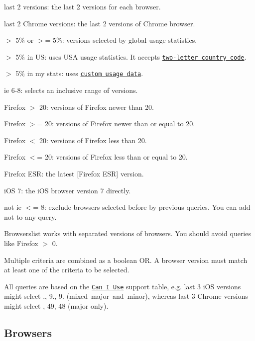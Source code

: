 \begin{DoxyItemize}
\item {\ttfamily last 2 versions}\+: the last 2 versions for each browser.
\item {\ttfamily last 2 Chrome versions}\+: the last 2 versions of Chrome browser.
\item {\ttfamily $>$ 5\%} or {\ttfamily $>$= 5\%}\+: versions selected by global usage statistics.
\item {\ttfamily $>$ 5\% in US}\+: uses U\+SA usage statistics. It accepts \href{http://en.wikipedia.org/wiki/ISO_3166-1_alpha-2#Officially_assigned_code_elements}{\tt two-\/letter country code}.
\item {\ttfamily $>$ 5\% in my stats}\+: uses \href{#custom-usage-data}{\tt custom usage data}.
\item {\ttfamily ie 6-\/8}\+: selects an inclusive range of versions.
\item {\ttfamily Firefox $>$ 20}\+: versions of Firefox newer than 20.
\item {\ttfamily Firefox $>$= 20}\+: versions of Firefox newer than or equal to 20.
\item {\ttfamily Firefox $<$ 20}\+: versions of Firefox less than 20.
\item {\ttfamily Firefox $<$= 20}\+: versions of Firefox less than or equal to 20.
\item {\ttfamily Firefox E\+SR}\+: the latest \mbox{[}Firefox E\+SR\mbox{]} version.
\item {\ttfamily i\+OS 7}\+: the i\+OS browser version 7 directly.
\item {\ttfamily not ie $<$= 8}\+: exclude browsers selected before by previous queries. You can add {\ttfamily not} to any query.
\end{DoxyItemize}

Browserslist works with separated versions of browsers. You should avoid queries like {\ttfamily Firefox $>$ 0}.

Multiple criteria are combined as a boolean {\ttfamily OR}. A browser version must match at least one of the criteria to be selected.

All queries are based on the \href{http://caniuse.com/}{\tt Can I Use} support table, e.\+g. {\ttfamily last 3 i\+OS versions} might select {., 9., 9.} (mixed major and minor), whereas {\ttfamily last 3 Chrome versions} might select {, 49, 48} (major only).

\subsection*{Browsers}

